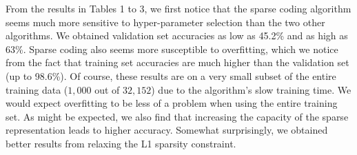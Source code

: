 \documentclass{article} %
\begin{document}
From the results in Tables 1 to 3, we first notice that the sparse coding algorithm seems much more sensitive to hyper-parameter selection than the two other algorithms. We obtained validation set accuracies as low as 45.2\% and as high as 63\%. Sparse coding also seems more susceptible to overfitting, which we notice from the fact that training set accuracies are much higher than the validation set (up to 98.6\%). Of course, these results are on a very small subset of the entire training data ($1,000$ out of $32,152$) due to the algorithm's slow training time. We would expect overfitting to be less of a problem when using the entire training set. As might be expected, we also find that increasing the capacity of the sparse representation leads to higher accuracy. Somewhat surprisingly, we obtained better results from relaxing the L1 sparsity constraint.
\end{document}
